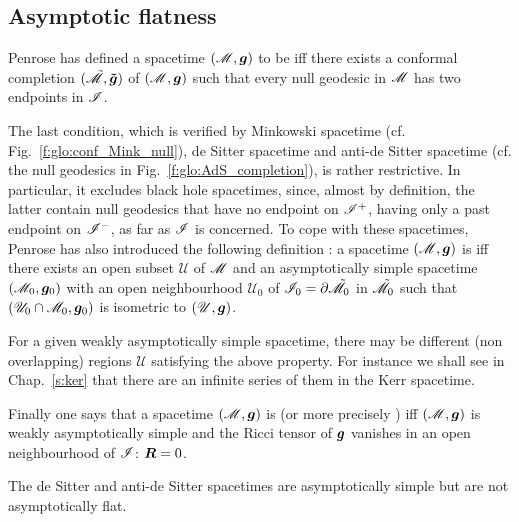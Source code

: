 \subsection{Asymptotic flatness} \label{s:glo:asymp_flat}

Penrose \cite{Penro64,Penro68} has defined
a spacetime $(\mathscr{M},\bm{g})$ to be  iff there exists
a conformal completion $(\tilde{\mathscr{M}},\bm{\tilde{g}})$
of $(\mathscr{M},\bm{g})$
such that every null geodesic in $\mathscr{M}$ has two endpoints in $\mathscr{I}$.

The last condition, which is verified by Minkowski spacetime (cf. Fig.~\ref{f:glo:conf_Mink_null}),
de Sitter spacetime and anti-de Sitter spacetime (cf. the null geodesics in
Fig.~\ref{f:glo:AdS_completion}), is rather restrictive. In particular, it excludes
black hole spacetimes, since, almost by definition, the latter contain null
geodesics that have no endpoint on $\mathscr{I}^+$, having only a past endpoint
on $\mathscr{I}^-$, as far as $\mathscr{I}$ is concerned. To cope with these spacetimes,
Penrose has also introduced the following definition \cite{Penro68}:
a spacetime $(\mathscr{M},\bm{g})$ is
 iff
there exists an open subset $\mathscr{U}$ of $\mathscr{M}$ and
an asymptotically simple spacetime $(\mathscr{M}_0, \bm{g}_0)$
with an open neighbourhood $\mathscr{U}_0$ of $\mathscr{I}_0 = \partial \tilde{\mathscr{M}}_0$
in $\tilde{\mathscr{M}}_0$ such that $(\mathscr{U}_0\cap \mathscr{M}_0,\bm{g}_0)$ is
isometric to $(\mathscr{U},\bm{g})$.

\begin{remark}
For a given weakly asymptotically simple spacetime, there may be different
(non overlapping) regions $\mathscr{U}$ satisfying the above property.
For instance we shall see in Chap.~\ref{s:ker}
that there are an infinite series of them in the Kerr spacetime.
\end{remark}

Finally one says that a spacetime $(\mathscr{M},\bm{g})$ is
(or more precisely  \cite{HawkiE73})
iff $(\mathscr{M},\bm{g})$ is weakly asymptotically simple and the Ricci tensor of
$\bm{g}$ vanishes in an open neighbourhood of $\mathscr{I}$: $\bm{R} = 0$.

\begin{example}
The de Sitter and anti-de Sitter spacetimes are asymptotically simple but
are not asymptotically flat.
\end{example}

